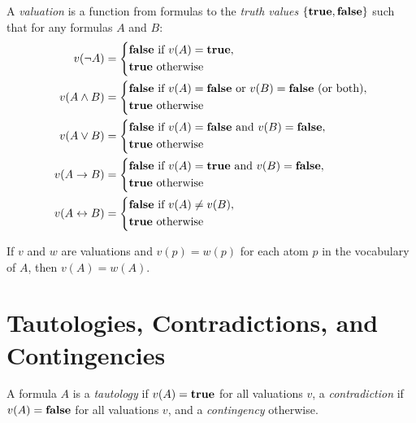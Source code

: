 \documentclass{article}
\begin{document}
\begin{definition}
    A \textit{valuation} is a function from formulas to the \textit{truth values} $\{ \mathbf{true}, \mathbf{false} \}$ such that for any formulas $A$ and $B$:
    \begin{align*}
        v(\neg A) & = \begin{dcases} \mathbf{false} \textrm{ if } v(A) = \mathbf{true}, \\ \mathbf{true} \textrm{ otherwise} \end{dcases} \\
        v(A \wedge B) & = \begin{dcases} \mathbf{false} \textrm{ if } v(A) = \mathbf{false} \textrm{ or } v(B) = \mathbf{false} \textrm{ (or both)}, \\ \mathbf{true} \textrm{ otherwise} \end{dcases} \\
        v(A \vee B) & = \begin{dcases} \mathbf{false} \textrm{ if } v(A) = \mathbf{false} \textrm{ and } v(B) = \mathbf{false}, \\ \mathbf{true} \textrm{ otherwise} \end{dcases} \\
        v(A \to B) & = \begin{dcases} \mathbf{false} \textrm{ if } v(A) = \mathbf{true} \textrm{ and } v(B) = \mathbf{false}, \\ \mathbf{true} \textrm{ otherwise}  \end{dcases} \\
        v(A \leftrightarrow B) & = \begin{dcases} \mathbf{false} \textrm{ if } v(A) \neq v(B), \\ \mathbf{true} \textrm{ otherwise} \end{dcases}
    \end{align*}
\end{definition}

\begin{proposition}
If $v$ and $w$ are valuations and $v(p) = w(p)$ for each atom $p$ in the vocabulary of $A$, then $v(A) = w(A)$.
\end{proposition}

\section*{Tautologies, Contradictions, and Contingencies}

\begin{definition}
    A formula $A$ is a \textit{tautology} if $v(A) = \mathbf{true}$ for all valuations $v$, a \textit{contradiction} if $v(A) = \mathbf{false}$ for all valuations $v$, and a \textit{contingency} otherwise.
\end{definition}
\end{document}
